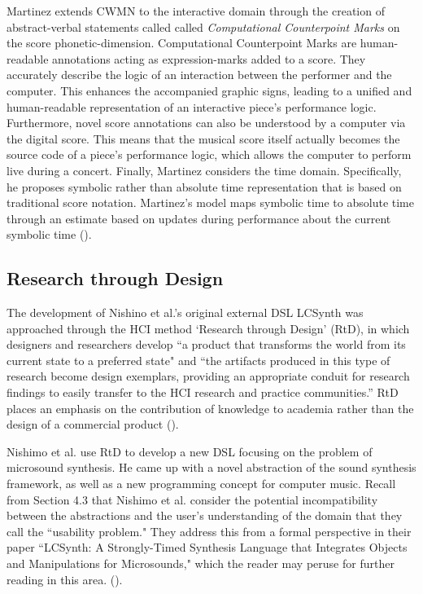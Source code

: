 \documentclass{report}
\newcommand\citeparen[1]{(\cite{#1})}
\begin{document}
Martinez extends CWMN to  the  interactive  domain through the creation of abstract-verbal statements called  called  \textit{Computational  Counterpoint Marks} on the score  phonetic-dimension. Computational  Counterpoint Marks are human-readable annotations acting  as expression-marks added  to a  score.  They accurately describe the logic of an interaction between the performer and the  computer. This  enhances the accompanied  graphic  signs,  leading  to a  unified and human-readable representation of an interactive  piece's  performance logic. Furthermore, novel score annotations can also be  understood by a computer via  the  digital  score. This means that the musical score itself actually becomes the source  code of a piece's  performance logic, which allows the  computer to perform live  during a concert. Finally, Martinez considers  the time domain. Specifically, he proposes symbolic rather  than absolute time representation that is  based on traditional score notation. Martinez's  model maps symbolic time  to  absolute time through an estimate based on updates during performance about the current  symbolic time \citeparen{martinez_2021}.
 
\subsection{Research through Design}
The development of Nishino et al.'s original external DSL LCSynth was approached through the HCI method `Research through Design' (RtD),   in which designers and researchers develop ``a product that transforms the world from its current state to a preferred state" and ``the artifacts produced in this type of research become design exemplars, providing an appropriate conduit for research findings to easily transfer to the HCI research and practice communities.” RtD places an emphasis on the contribution of knowledge to academia  rather than the design of a commercial product \citeparen{nishino_2012}.

Nishimo et al. use RtD to develop a new DSL focusing on the problem of microsound  synthesis. He came up with a novel  abstraction of the sound synthesis framework, as well  as a new programming concept for computer music. Recall from Section 4.3 that Nishimo  et al. consider the potential incompatibility between the abstractions and the user's understanding of the domain that they call   the ``usability problem." They address this from  a formal perspective in their paper ``LCSynth: A Strongly-Timed Synthesis Language that Integrates Objects and Manipulations for Microsounds," which the reader may peruse for further  reading in this area. 
 \citeparen{nishino_2012}.
\end{document}
